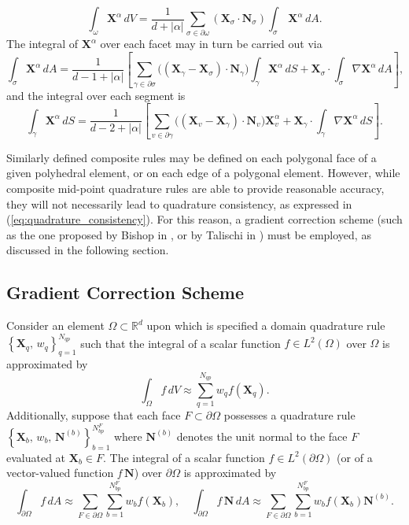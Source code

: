 	\begin{equation}
		\int_{\omega} \mathbf{X}^\alpha \, dV = \frac{1}{d+|\alpha|} \sum_{\sigma \in \partial \omega} (\mathbf{X}_\sigma \cdot \mathbf{N}_{\sigma}) \int_{\sigma} \, \mathbf{X}^\alpha \, dA.
	\end{equation}
	The integral of $\mathbf{X}^\alpha$ over each facet may in turn be carried out via
	\begin{equation}
		\int_{\sigma} \mathbf{X}^\alpha \, dA = \frac{1}{d-1+|\alpha|} \left[ \sum_{\gamma \in \partial \sigma} \big( (\mathbf{X}_\gamma-\mathbf{X}_\sigma) \cdot \mathbf{N}_{\gamma} \big) \int_{\gamma} \mathbf{X}^\alpha \, dS + \mathbf{X}_\sigma \cdot \int_{\sigma} \nabla \mathbf{X}^\alpha \, dA \right],
	\end{equation}
	and the integral over each segment is
	\begin{equation}
		\int_{\gamma} \mathbf{X}^\alpha \, dS = \frac{1}{d-2+|\alpha|} \left[ \sum_{v \in \partial \gamma} \big( (\mathbf{X}_v-\mathbf{X}_\gamma) \cdot \mathbf{N}_{v} \big) \mathbf{X}^\alpha_v + \mathbf{X}_\gamma \cdot \int_{\gamma} \nabla \mathbf{X}^\alpha \, dS \right].
	\end{equation}
	
	Similarly defined composite rules may be defined on each polygonal face of a given polyhedral element, or on each edge of a polygonal element. However, while composite mid-point quadrature rules are able to provide reasonable accuracy, they will not necessarily lead to quadrature consistency, as expressed in (\ref{eq:quadrature_consistency}). For this reason, a gradient correction scheme (such as the one proposed by Bishop in \cite{Bishop:14}, or by Talischi in \cite{Talischi:15}) must be employed, as discussed in the following section.
	
	\subsection*{Gradient Correction Scheme}
	
	Consider an element $\Omega \subset \mathbb{R}^d$ upon which is specified a domain quadrature rule $\left\{ \mathbf{X}_q, \, w_q \right\}_{q=1}^{N_{qp}}$ such that the integral of a scalar function $f \in L^2 (\Omega)$ over $\Omega$ is approximated by
	\begin{equation}
		\int_\Omega f \, dV \approx \sum_{q=1}^{N_{qp}} w_q f(\mathbf{X}_q).
	\end{equation}
	Additionally, suppose that each face $F \subset \partial \Omega$ possesses a quadrature rule $\left\{ \mathbf{X}_b, \, w_b, \, \mathbf{N}^{(b)} \right\}_{b=1}^{N^{F}_{bp}}$ where $\mathbf{N}^{(b)}$ denotes the unit normal to the face $F$ evaluated at $\mathbf{X}_b \in F$. The integral of a scalar function $f \in L^2 (\partial \Omega)$ (or of a vector-valued function $f \, \mathbf{N}$) over $\partial \Omega$ is approximated by
	\begin{equation}
		\int_{\partial \Omega} f \, dA \approx \sum_{F \in \partial \Omega} \sum_{b=1}^{N^F_{bp}} w_b f(\mathbf{X}_b), \quad \int_{\partial \Omega} f \, \mathbf{N} \, dA \approx \sum_{F \in \partial \Omega} \sum_{b=1}^{N^F_{bp}} w_b f(\mathbf{X}_b) \mathbf{N}^{(b)}.
	\end{equation}
	
